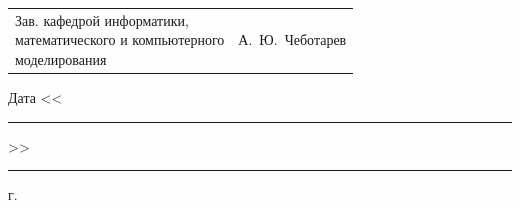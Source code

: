 \documentclass{imcs}
\begin{document}
\vspace{2\baselineskip}
\noindent\begin{tabular}{p{} p{}}
\parbox{8cm}{Зав. кафедрой информатики,\\ математического и компьютерного\\ моделирования} &
\hfill А.~Ю.~Чеботарев\\
\end{tabular}
\vspace{2\baselineskip}
\begin{flushright}
Дата <<\rule{1cm}{0.5pt}>>\rule{3cm}{0.5pt} г.
\end{flushright}
\end{document}

